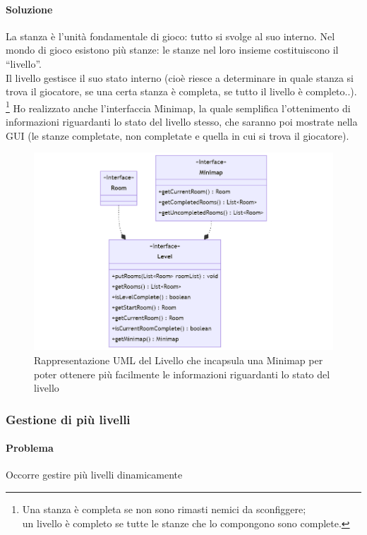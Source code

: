 \documentclass[a4paper,12pt]{report}
\begin{document}
\paragraph{Soluzione} La stanza è l'unità fondamentale di gioco: tutto si svolge al suo interno. Nel mondo di gioco esistono più stanze: le stanze nel loro insieme costituiscono il ``livello''. 
\\Il livello gestisce il suo stato interno (cioè riesce a determinare in quale stanza si trova il giocatore, se una certa stanza è completa, se tutto il livello è completo..).
\footnote{Una stanza è completa se non sono rimasti nemici da sconfiggere; \\un livello è completo se tutte le stanze che lo compongono sono complete.}
Ho realizzato anche l'interfaccia Minimap, la quale semplifica l'ottenimento di informazioni riguardanti lo stato del livello stesso,
che saranno poi mostrate nella GUI (le stanze completate, non completate e quella in cui si trova il giocatore). 
\begin{figure}[H]
    \centering{}
    \includegraphics[scale=0.5]{diagram/minimapLevel.png}
    \caption{Rappresentazione UML del Livello che incapsula una Minimap per poter ottenere più facilmente le informazioni riguardanti lo
    stato del livello}
    \label{img:minimapLevel}
\end{figure}


\subsubsection{Gestione di più livelli}
\paragraph{Problema} Occorre gestire più livelli dinamicamente
\end{document}
